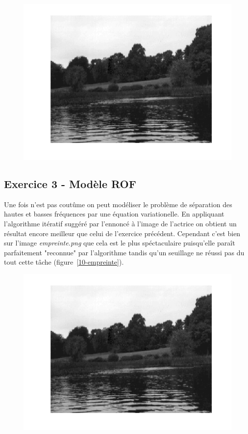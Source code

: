 \documentclass{article}
\begin{document}
\begin{figure}[!ht]
\includegraphics[width=\textwidth]{images/1/1-1-autumn_b.png}
\end{figure}

\subsection{Exercice 3 - Modèle ROF}
Une fois n'est pas coutûme on peut modéliser le problème de séparation des hautes et basses fréquences par une équation variationelle. En appliquant l'algorithme itératif suggéré par l'ennoncé à l'image de l'actrice on obtient un résultat encore meilleur que celui de l'exercice précédent. Cependant c'est bien sur l'image \emph{empreinte.png} que cela est le plus spéctaculaire puisqu'elle paraît parfaitement "reconnue" par l'algorithme tandis qu'un seuillage ne réussi pas du tout cette tâche (figure~\ref{10-empreinte}).

\begin{figure}[!ht]
\includegraphics[width=\textwidth]{images/1/1-1-autumn_b.png}
\end{figure}
\end{document}
